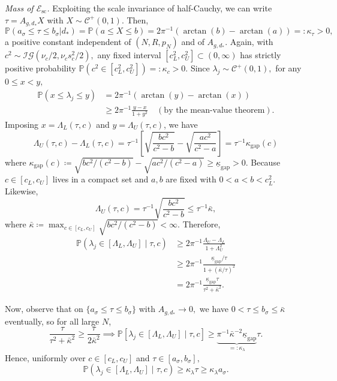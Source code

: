 \documentclass[11pt]{article}
\theoremstyle{plain}
\theoremstyle{definition}
\theoremstyle{plain}
\begin{document}
\medskip\noindent\emph{Mass of $\mathcal E_{\mathrm{sc}}$.}
Exploiting the scale invariance of half-Cauchy, we can write $\tau=A_{g,d_{*}} X$ with $X \sim \mathcal{C}^{+}(0,1).$ Then, 
\[
\mathbb{P}(a_{\sigma} \le \tau \le b_{\sigma} \vert d_{*}) = \mathbb{P}(a \le X \le b) = 2\pi^{-1}(\arctan(b)-\arctan(a)) =: \kappa_{\tau} >0,
\]
a positive constant independent of $(N,R,p_N)$ and of $A_{g,d_*}.$ Again, with $c^2 \sim \mathcal{IG}(\nu_c /2,\nu_c s_c ^2/2),$ any fixed interval $[c_L ^2, c_U ^2] \subset (0,\infty)$ has strictly positive probability $\mathbb{P}(c^2 \in [c_L ^2, c_U ^2]) =: \kappa_c >0.$ Since $\lambda_j \sim \mathcal{C}^{+}(0,1),$ for any $0 \le x<y,$ 
\begin{equation*}
    \begin{split}
        \mathbb{P}(x \le \lambda_j \le y) & = 2\pi^{-1} (\arctan(y)-\arctan(x)) \\
        & \ge 2\pi^{-1} \frac{y-x}{1+y^2} \quad (\text{by the mean-value theorem}).
    \end{split}
\end{equation*}
Imposing $x=\Lambda_{L}(\tau,c)$ and $y=\Lambda_{U}(\tau,c)$, we have \[
\Lambda_{U}(\tau,c)-\Lambda_{L}(\tau,c) = \tau^{-1} \left[\sqrt{\frac{bc^2}{c^2-b}}-\sqrt{\frac{ac^2}{c^2-a}}\right]=\tau^{-1} \kappa_{\textrm{gap}}(c)
\]
where $\kappa_{\textrm{gap}}(c) \coloneqq \sqrt{bc^2/(c^2-b)}-\sqrt{ac^2/(c^2-a)} \ge \underline{\kappa}_{\textrm{gap}} > 0$. Because $c \in [c_L,c_U]$ lives in a compact set and $a,b$ are fixed with $0<a<b<c_L^2$. Likewise, 
\[
\Lambda_{U}(\tau,c) = \tau^{-1}\sqrt{\frac{bc^2}{c^2-b}} \le \tau^{-1} \bar{\kappa},
\]
where $\bar{\kappa} \coloneqq \max_{c \in [c_L,c_U]} \sqrt{bc^2/(c^2-b)} < \infty.$ Therefore, \begin{align*}
    \mathbb{P}(\lambda_j \in [\Lambda_L,\Lambda_U] \mid \tau,c) & \ge 2 \pi^{-1} \frac{\Lambda_{U}-\Lambda_{L}}{1+\Lambda_U ^2} \\
    & \ge 2 \pi^{-1} \frac{\underline{\kappa}_{\textrm{gap}}/\tau}{1+ (\bar{\kappa}/\tau)^2} \\
    & = 2 \pi^{-1} \frac{\underline{\kappa}_{\textrm{gap}} \tau}{\tau^2 + \bar{\kappa}^2}.
\end{align*}

Now, observe that on $\{a_\sigma \le \tau \le b_{\sigma}\}$ with $A_{g,d_{*}} \rightarrow 0,$ we have $0 < \tau \le b_{\sigma} \le \bar{\kappa}$ eventually, so for all large $N$, \[
\frac{\tau}{\tau^2+\bar{\kappa}^2} \ge \frac{\tau}{2 \bar{\kappa}^2} \implies \mathbb{P}[\lambda_j \in [\Lambda_L,\Lambda_U] \mid \tau,c] \ge \underbrace{\pi^{-1} \bar{\kappa}^{-2} \underline{\kappa}_{\textrm{gap}}}_{=:\kappa_{\lambda}} \tau. 
\]
Hence, uniformly over $c \in [c_L,c_U]$ and $\tau \in [a_{\sigma},b_{\sigma}],$ \[
\mathbb{P}(\lambda_j \in [\Lambda_L,\Lambda_U] \mid \tau,c) \ge \kappa_{\lambda} \tau \ge \kappa_{\lambda} a_{\sigma}.
\]
\end{document}
